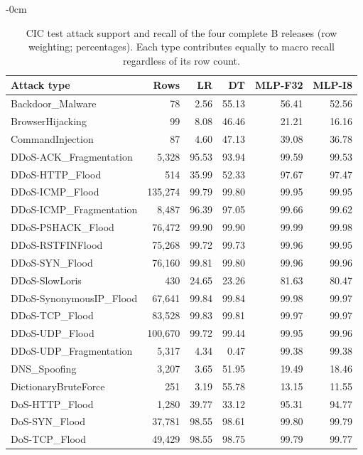 \begin{table}[!htbp]
\begin{adjustwidth}{-\extralength}{0cm}
\color{RevisionBlue}
\captionsetup{font+=revisionblue}
\caption{CIC test attack support and recall of the four complete B releases (row weighting; percentages). Each type contributes equally to macro recall regardless of its row count.}\label{tab:cic-types}
\centering\footnotesize\setlength{\tabcolsep}{4pt}
\begin{tabular}{lrrrrr}
\toprule Attack type & Rows & LR & DT & MLP-F32 & MLP-I8\\
\midrule
Backdoor\_Malware & 78 & 2.56 & 55.13 & 56.41 & 52.56\\
BrowserHijacking & 99 & 8.08 & 46.46 & 21.21 & 16.16\\
CommandInjection & 87 & 4.60 & 47.13 & 39.08 & 36.78\\
DDoS-ACK\_Fragmentation & 5,328 & 95.53 & 93.94 & 99.59 & 99.53\\
DDoS-HTTP\_Flood & 514 & 35.99 & 52.33 & 97.67 & 97.47\\
DDoS-ICMP\_Flood & 135,274 & 99.79 & 99.80 & 99.95 & 99.95\\
DDoS-ICMP\_Fragmentation & 8,487 & 96.39 & 97.05 & 99.66 & 99.62\\
DDoS-PSHACK\_Flood & 76,472 & 99.90 & 99.90 & 99.99 & 99.98\\
DDoS-RSTFINFlood & 75,268 & 99.72 & 99.73 & 99.96 & 99.95\\
DDoS-SYN\_Flood & 76,160 & 99.81 & 99.80 & 99.96 & 99.96\\
DDoS-SlowLoris & 430 & 24.65 & 23.26 & 81.63 & 80.47\\
DDoS-SynonymousIP\_Flood & 67,641 & 99.84 & 99.84 & 99.98 & 99.97\\
DDoS-TCP\_Flood & 83,528 & 99.83 & 99.81 & 99.97 & 99.97\\
DDoS-UDP\_Flood & 100,670 & 99.72 & 99.44 & 99.95 & 99.96\\
DDoS-UDP\_Fragmentation & 5,317 & 4.34 & 0.47 & 99.38 & 99.38\\
DNS\_Spoofing & 3,207 & 3.65 & 51.95 & 19.49 & 18.46\\
DictionaryBruteForce & 251 & 3.19 & 55.78 & 13.15 & 11.55\\
DoS-HTTP\_Flood & 1,280 & 39.77 & 33.12 & 95.31 & 94.77\\
DoS-SYN\_Flood & 37,781 & 98.55 & 98.61 & 99.80 & 99.79\\
DoS-TCP\_Flood & 49,429 & 98.55 & 98.75 & 99.79 & 99.77\\

\end{tabular}
\end{adjustwidth}
\end{table}
